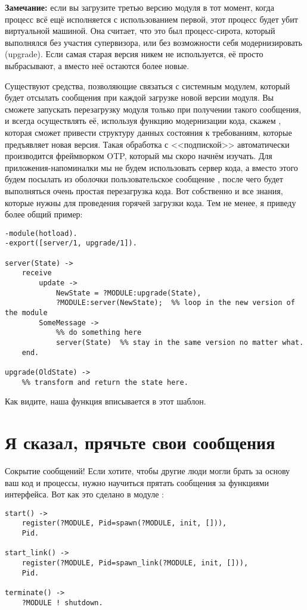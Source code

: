 \colorbox{lgray}
{
\begin{minipage}{1.0\linewidth}
    \textbf{Замечание:} если вы загрузите третью версию модуля в тот момент, когда процесс всё ещё исполняется с использованием первой, этот процесс будет убит виртуальной машиной.
    Она считает, что это был процесс\--сирота, который выполнялся без участия супервизора, или без возможности себя модернизировать (upgrade). 
    Если самая старая версия никем не используется, её просто выбрасывают, а вместо неё остаются более новые.
\end{minipage}
}

Существуют средства, позволяющие связаться с системным модулем, который будет отсылать сообщения при каждой загрузке новой версии модуля.
Вы сможете запускать перезагрузку модуля только при получении такого сообщения, и всегда осуществлять её, используя функцию модернизации кода, скажем , которая сможет привести структуру данных состояния к требованиям, которые предъявляет новая версия.
Такая обработка с <<подпиской>> автоматически производится фреймворком OTP, который мы скоро начнём изучать.
Для приложения\--напоминалки мы не будем использовать сервер кода, а вместо этого будем посылать из оболочки пользовательское сообщение , после чего будет выполняться очень простая перезагрузка кода.
Вот собственно и все знания, которые нужны для проведения горячей загрузки кода.
Тем не менее, я приведу более общий пример:
\begin{lstlisting}[style=erlang]
-module(hotload).
-export([server/1, upgrade/1]).
 
server(State) ->
    receive
        update ->
            NewState = ?MODULE:upgrade(State),
            ?MODULE:server(NewState);  %% loop in the new version of the module
        SomeMessage ->
            %% do something here
            server(State)  %% stay in the same version no matter what.
    end.
 
upgrade(OldState) ->
    %% transform and return the state here.
\end{lstlisting}

Как видите, наша функция  вписывается в этот шаблон.
\section{Я сказал, прячьте свои сообщения}
\label{i-said-hide-your-messages}
Сокрытие сообщений!
Если хотите, чтобы другие люди могли брать за основу ваш код и процессы, нужно научиться прятать сообщения за функциями интерфейса.
Вот как это сделано в модуле :
\begin{lstlisting}[style=erlang]
start() ->
    register(?MODULE, Pid=spawn(?MODULE, init, [])),
    Pid.
 
start_link() ->
    register(?MODULE, Pid=spawn_link(?MODULE, init, [])),
    Pid.
 
terminate() ->
    ?MODULE ! shutdown.
\end{lstlisting}


